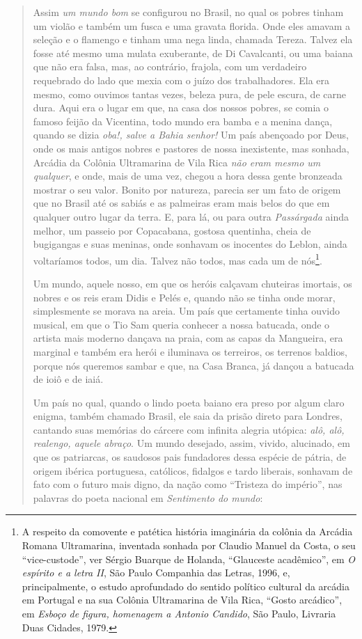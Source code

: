 \begin{quote}
Assim \emph{um mundo bom} se configurou no Brasil, no qual os pobres
tinham um violão e também um fusca e uma gravata florida. Onde eles
amavam a seleção e o flamengo e tinham uma nega linda, chamada Tereza.
Talvez ela fosse até mesmo uma mulata exuberante, de Di Cavalcanti, ou
uma baiana que não era falsa, mas, ao contrário, frajola, com um
verdadeiro requebrado do lado que mexia com o juízo dos trabalhadores.
Ela era mesmo, como ouvimos tantas vezes, beleza pura, de pele escura,
de carne dura. Aqui era o lugar em que, na casa dos nossos pobres, se
comia o famoso feijão da Vicentina, todo mundo era bamba e a menina
dança, quando se dizia \emph{oba!, salve a Bahia senhor!} Um país
abençoado por Deus, onde os mais antigos nobres e pastores de nossa
inexistente, mas sonhada, Arcádia da Colônia Ultramarina de Vila Rica
\emph{não eram mesmo um qualquer}, e onde, mais de uma vez, chegou a
hora dessa gente bronzeada mostrar o seu valor. Bonito por natureza,
parecia ser um fato de origem que no Brasil até os sabiás e as palmeiras
eram mais belos do que em qualquer outro lugar da terra. E, para lá, ou
para outra \emph{Passárgada} ainda melhor, um passeio por Copacabana,
gostosa quentinha, cheia de bugigangas e suas meninas, onde sonhavam os
inocentes do Leblon, ainda voltaríamos todos, um dia. Talvez não todos,
mas cada um de nós\footnote{A respeito da comovente e patética história
  imaginária da colônia da Arcádia Romana Ultramarina, inventada sonhada
  por Claudio Manuel da Costa, o seu ``vice-custode'', ver Sérgio
  Buarque de Holanda, ``Glauceste acadêmico'', em \emph{O espírito e a
  letra II}, São Paulo Companhia das Letras, 1996, e, principalmente, o
  estudo aprofundado do sentido político cultural da arcádia em Portugal
  e na sua Colônia Ultramarina de Vila Rica, ``Gosto arcádico'', em
  \emph{Esboço de figura, homenagem a Antonio Candido}, São Paulo,
  Livraria Duas Cidades, 1979.}.

Um mundo, aquele nosso, em que os heróis calçavam chuteiras imortais, os
nobres e os reis eram Didis e Pelés e, quando não se tinha onde morar,
simplesmente se morava na areia. Um país que certamente tinha ouvido
musical, em que o Tio Sam queria conhecer a nossa batucada, onde o
artista mais moderno dançava na praia, com as capas da Mangueira, era
marginal e também era herói e iluminava os terreiros, os terrenos
baldios, porque nós queremos sambar e que, na Casa Branca, já dançou a
batucada de ioiô e de iaiá.

Um país no qual, quando o lindo poeta baiano era preso por algum claro
enigma, também chamado Brasil, ele saia da prisão direto para Londres,
cantando suas memórias do cárcere com infinita alegria utópica:
\emph{alô, alô, realengo, aquele abraço}. Um mundo desejado, assim,
vivido, alucinado, em que os patriarcas, os saudosos pais fundadores
dessa espécie de pátria, de origem ibérica portuguesa, católicos,
fidalgos e tardo liberais, sonhavam de fato com o futuro mais digno, da
nação como ``Tristeza do império'', nas palavras do poeta nacional em
\emph{Sentimento do mundo}:


\end{quote}

